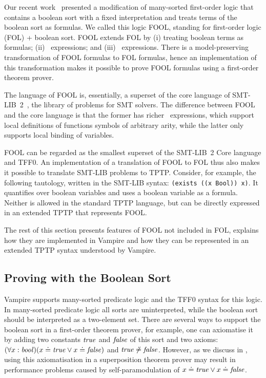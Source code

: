 Our recent work~\cite{FOOL} presented a modification of many-sorted first-order logic that contains a boolean sort with a fixed interpretation and treats terms of the boolean sort as formulas. We called this logic FOOL, standing for first-order logic (FOL) + boolean sort. FOOL extends FOL by (i) treating boolean terms as formulas; (ii) \ITE\ expressions; and (iii) \LETIN\ expressions. There is a model-preserving transformation of FOOL formulas to FOL formulas, hence an implementation of this transformation makes it possible to prove FOOL formulas using a first-order theorem prover.

The language of FOOL is, essentially, a superset of the core language of SMT-LIB~2~\cite{SMT-LIB}, the library of problems for SMT solvers. The difference between FOOL and the core language is that the former has richer \LETIN\ expressions, which support local definitions of functions symbols of arbitrary arity, while the latter only supports local binding of variables.

FOOL can be regarded as the smallest superset of the SMT-LIB~2 Core language and TFF0. An implementation of a translation of FOOL to FOL thus also makes it possible to translate SMT-LIB problems to TPTP. Consider, for example, the following tautology, written in the SMT-LIB syntax: \lstinline'(exists ((x Bool)) x)'. It quantifies over boolean variables and uses a boolean variable as a formula. Neither is allowed in the standard TPTP language, but can be directly expressed in an extended TPTP that represents FOOL.

The rest of this section presents features of FOOL not included in FOL, explains how they are implemented in Vampire and how they can be represented in an extended TPTP syntax understood by Vampire.

\subsection{Proving with the Boolean Sort}

Vampire supports many-sorted predicate logic and the TFF0 syntax for this logic. In many-sorted predicate logic all sorts are uninterpreted, while the boolean sort should be interpreted as a two-element set. There are several ways to support the boolean sort in a first-order theorem prover, for example, one can axiomatise it by adding two constants $\mathit{true}$ and $\mathit{false}$ of this sort and two axioms: $(\forall x:\mathit{bool})(x \doteq \mathit{true} \lor x \doteq \mathit{false})$ and $\mathit{true} \not\doteq \mathit{false}$. However, as we discuss in \cite{FOOL}, using this axiomatisation in a superposition theorem prover may result in performance problems caused by self-paramodulation of $x \doteq \mathit{true} \lor x \doteq \mathit{false}$.

